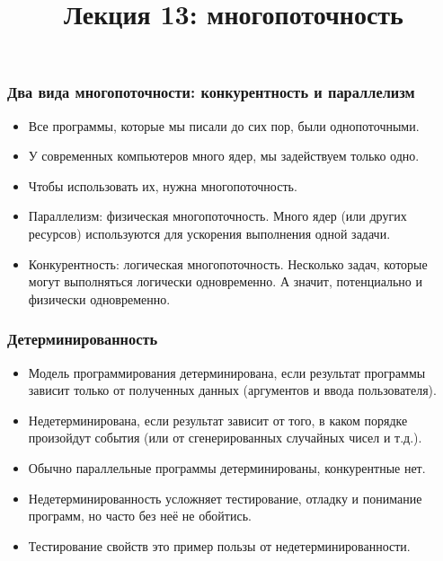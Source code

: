 \documentclass[11pt]{beamer}
\title{Лекция 13: многопоточность}
\begin{document}
\begin{frame}[plain]
  \maketitle
\end{frame}

\begin{frame}[fragile]
  \frametitle{Два вида многопоточности: конкурентность и параллелизм}
  \begin{itemize}
    \item Все программы, которые мы писали до сих пор, были однопоточными.
    \item У современных компьютеров много ядер, мы задействуем только одно.
    \item Чтобы использовать их, нужна многопоточность. \pause
    \item Параллелизм: физическая многопоточность. Много ядер (или других ресурсов) используются для ускорения выполнения одной задачи. \pause
    \item Конкурентность: логическая многопоточность. Несколько задач, которые могут выполняться логически одновременно. А значит, потенциально и физически одновременно.
  \end{itemize}
\end{frame}

\begin{frame}[fragile]
  \frametitle{Детерминированность}
  \begin{itemize}
    \item Модель программирования детерминирована, если результат программы зависит только от полученных данных (аргументов и ввода пользователя). \pause
    \item Недетерминирована, если результат зависит от того, в каком порядке произойдут события (или от сгенерированных случайных чисел и т.д.). \pause
    \item Обычно параллельные программы детерминированы, конкурентные нет.
    \item Недетерминированность усложняет тестирование, отладку и понимание программ, но часто без неё не обойтись.
    \item Тестирование свойств это пример пользы от недетерминированности.
  \end{itemize}
\end{frame}
\end{document}

